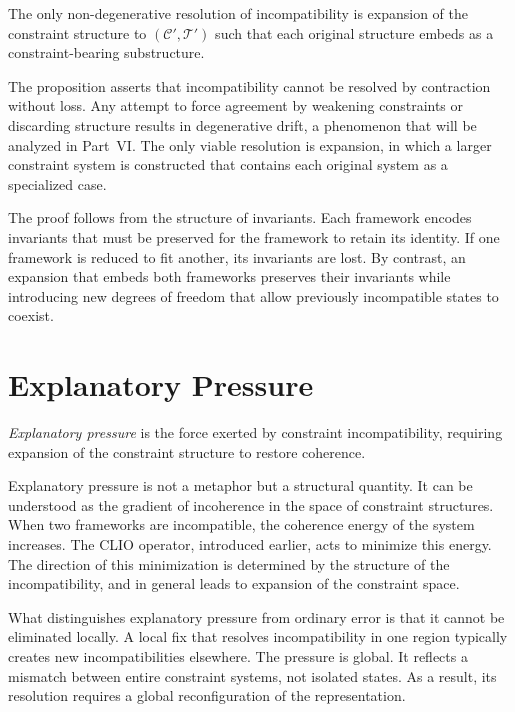 \documentclass[11pt,openany]{book}
\begin{document}
\begin{proposition}
\label{prop:expansion}
The only non-degenerative resolution of incompatibility is
expansion of the constraint structure to $(\mathcal{C}',
\mathcal{T}')$ such that each original structure embeds as
a constraint-bearing substructure.
\end{proposition}

The proposition asserts that incompatibility cannot be
resolved by contraction without loss. Any attempt to force
agreement by weakening constraints or discarding structure
results in degenerative drift, a phenomenon that will be
analyzed in Part~VI. The only viable resolution is
expansion, in which a larger constraint system is
constructed that contains each original system as a
specialized case.

The proof follows from the structure of invariants. Each
framework encodes invariants that must be preserved for the
framework to retain its identity. If one framework is
reduced to fit another, its invariants are lost. By
contrast, an expansion that embeds both frameworks
preserves their invariants while introducing new degrees
of freedom that allow previously incompatible states to
coexist.

\section{Explanatory Pressure}
\label{sec:pressure}

\begin{definition}
\label{def:pressure}
\emph{Explanatory pressure} is the force exerted by
constraint incompatibility, requiring expansion of the
constraint structure to restore coherence.
\end{definition}

Explanatory pressure is not a metaphor but a structural
quantity. It can be understood as the gradient of
incoherence in the space of constraint structures. When
two frameworks are incompatible, the coherence energy of
the system increases. The CLIO operator, introduced
earlier, acts to minimize this energy. The direction of
this minimization is determined by the structure of the
incompatibility, and in general leads to expansion of the
constraint space.

What distinguishes explanatory pressure from ordinary
error is that it cannot be eliminated locally. A local fix
that resolves incompatibility in one region typically
creates new incompatibilities elsewhere. The pressure is
global. It reflects a mismatch between entire constraint
systems, not isolated states. As a result, its resolution
requires a global reconfiguration of the representation.
\end{document}
